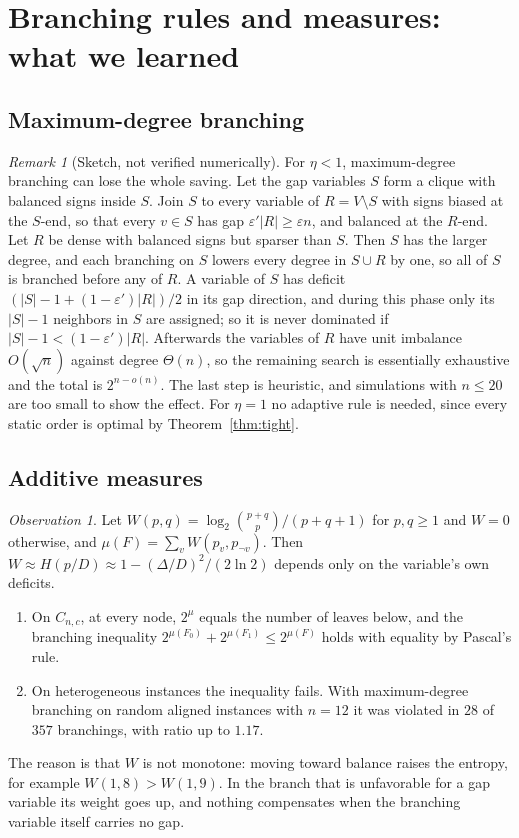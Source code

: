 \documentclass[11pt,a4paper]{article}
\theoremstyle{remark}
\newtheorem{remark}[theorem]{Remark}
\newtheorem{observation}[theorem]{Observation}
\begin{document}
\section{Branching rules and measures: what we learned}

\subsection{Maximum-degree branching}

\begin{remark}[Sketch, not verified numerically]\label{rem:maxdeg}
For $\eta<1$, maximum-degree branching can lose the whole saving. Let the gap
variables $S$ form a clique with balanced signs inside $S$. Join $S$ to every
variable of $R=V\setminus S$ with signs biased at the $S$-end, so that every
$v\in S$ has gap $\varepsilon'|R|\ge\varepsilon n$, and balanced at the
$R$-end. Let $R$ be dense with balanced signs but sparser than $S$. Then $S$
has the larger degree, and each branching on $S$ lowers every degree in
$S\cup R$ by one, so all of $S$ is branched before any of $R$. A variable of
$S$ has deficit $(|S|-1+(1-\varepsilon')|R|)/2$ in its gap direction, and
during this phase only its $|S|-1$ neighbors in $S$ are assigned; so it is
never dominated if $|S|-1<(1-\varepsilon')|R|$. Afterwards the variables of
$R$ have unit imbalance $O(\sqrt n)$ against degree $\Theta(n)$, so the
remaining search is essentially exhaustive and the total is $2^{n-o(n)}$.
The last step is heuristic, and simulations with $n\le20$ are too small to
show the effect. For $\eta=1$ no adaptive rule is needed, since every static
order is optimal by Theorem~\ref{thm:tight}.
\end{remark}

\subsection{Additive measures}\label{sec:additive}

\begin{observation}\label{obs:entropy}
Let $W(p,q)=\log_2\binom{p+q}p/(p+q+1)$ for $p,q\ge1$ and $W=0$ otherwise, and
$\mu(F)=\sum_vW(p_v,p_{\neg v})$. Then $W\approx H(p/D)\approx
1-(\Delta/D)^2/(2\ln2)$ depends only on the variable's own deficits.
\begin{enumerate}
 \item On $C_{n,c}$, at every node, $2^{\mu}$ equals the number of leaves
 below, and the branching inequality $2^{\mu(F_0)}+2^{\mu(F_1)}\le2^{\mu(F)}$
 holds with equality by Pascal's rule.
 \item On heterogeneous instances the inequality fails. With maximum-degree
 branching on random aligned instances with $n=12$ it was violated in $28$ of
 $357$ branchings, with ratio up to $1.17$.
\end{enumerate}
The reason is that $W$ is not monotone: moving toward balance raises the
entropy, for example $W(1,8)>W(1,9)$. In the branch that is unfavorable for a
gap variable its weight goes up, and nothing compensates when the branching
variable itself carries no gap.
\end{observation}
\end{document}
